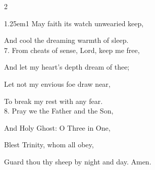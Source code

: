 \begin{multicols}{2}
\begin{hangparas}{1.25em}{1}
May faith its watch unwearied keep,

And cool the dreaming warmth of sleep.\\

7. From cheats of sense, Lord, keep me free,

And let my heart's depth dream of thee;

Let not my envious foe draw near,

To break my rest with any fear.\\

8. Pray we the Father and the Son,

And Holy Ghost: O Three in One,

Blest Trinity, whom all obey,

Guard thou thy sheep by night and day. Amen.
\end{hangparas}

\fussy
\end{multicols}

\clearpage
{}

